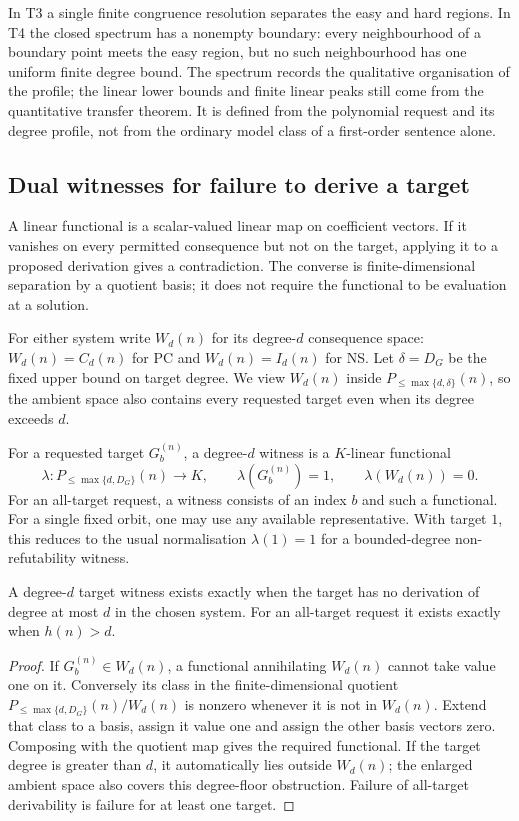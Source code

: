 In T3 a single finite congruence resolution separates the easy and
hard regions. In T4 the closed spectrum has a nonempty boundary:
every neighbourhood of a boundary point meets the easy region, but
no such neighbourhood has one uniform finite degree bound.
The spectrum records the qualitative organisation of the profile;
the linear lower bounds and finite linear peaks still come from the
quantitative transfer theorem. It is defined from the polynomial
request and its degree profile, not from the ordinary model class
of a first-order sentence alone.

\subsection{Dual witnesses for failure to derive a target}
A linear functional is a scalar-valued linear map on coefficient
vectors. If it vanishes on every permitted consequence but not on
the target, applying it to a proposed derivation gives a contradiction.
The converse is finite-dimensional separation by a quotient basis;
it does not require the functional to be evaluation at a solution.

For either system write $W_d(n)$ for its degree-$d$ consequence space:
$W_d(n)=C_d(n)$ for PC and $W_d(n)=I_d(n)$ for NS. Let
$\delta=D_G$ be the fixed upper bound on target degree. We view
$W_d(n)$ inside $P_{\le\max\{d,\delta\}}(n)$, so the ambient space
also contains every requested target even when its degree exceeds $d$.

\begin{definition}
\label{def:consistency-witness}
For a requested target $G_b^{(n)}$, a degree-$d$ witness is a $K$-linear
functional
\[
 \lambda:P_{\le\max\{d,D_G\}}(n)\longrightarrow K,\qquad
 \lambda(G_b^{(n)})=1,\qquad\lambda(W_d(n))=0.
\]
For an all-target request, a witness consists of an index $b$ and such
a functional. For a single fixed orbit, one may use any available
representative. With target $1$, this reduces to the usual normalisation
$\lambda(1)=1$ for a bounded-degree non-refutability witness.
\end{definition}

\begin{proposition}
\label{prop:dual-witness}
A degree-$d$ target witness exists exactly when the target has no
derivation of degree at most $d$ in the chosen system. For an all-target
request it exists exactly when $h(n)>d$.
\end{proposition}
\begin{proof}
If $G_b^{(n)}\in W_d(n)$, a functional annihilating $W_d(n)$ cannot
take value one on it. Conversely its class in the finite-dimensional
quotient $P_{\le\max\{d,D_G\}}(n)/W_d(n)$ is nonzero whenever
it is not in $W_d(n)$. Extend that class to a basis, assign it value
one and assign the other basis vectors zero. Composing with the
quotient map gives the required functional. If the target degree is
greater than $d$, it automatically lies outside $W_d(n)$; the enlarged
ambient space also covers this degree-floor obstruction. Failure of
all-target derivability is failure for at least one target.
\end{proof}

